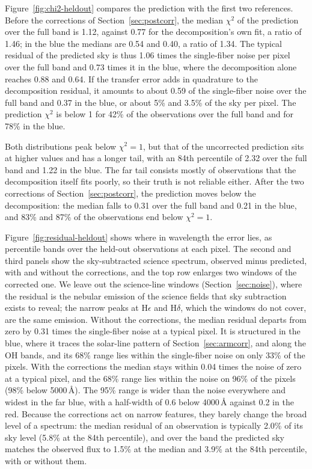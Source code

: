 Figure~\ref{fig:chi2-heldout} compares the prediction with the first two
references. Before the corrections of Section~\ref{sec:postcorr}, the median
$\chi^2$ of the prediction over the full band is 1.12, against 0.77 for the
decomposition's own fit, a ratio of 1.46; in the blue the medians are 0.54
and 0.40, a ratio of 1.34. The typical residual of the predicted sky is thus
1.06 times the single-fiber noise per pixel over the full band and 0.73
times it in the blue, where the decomposition alone reaches 0.88 and 0.64.
If the transfer error adds in quadrature to the decomposition residual, it
amounts to about 0.59 of the single-fiber noise over the full band and 0.37
in the blue, or about 5\% and 3.5\% of the sky per pixel. The prediction
$\chi^2$ is below 1 for 42\% of the observations over the full band and for
78\% in the blue.

Both distributions peak below $\chi^2=1$, but that of the uncorrected
prediction sits at higher values and has a longer tail, with an 84th
percentile of 2.32 over the full band and 1.22 in the blue. The far tail
consists mostly of observations that the decomposition itself fits poorly,
so their truth is not reliable either. After the two corrections of
Section~\ref{sec:postcorr}, the prediction moves below the decomposition:
the median falls to 0.31 over the full band and 0.21 in the blue, and 83\%
and 87\% of the observations end below $\chi^2=1$.

Figure~\ref{fig:residual-heldout} shows where in wavelength the error lies,
as percentile bands over the held-out observations at each pixel. The
second and third panels show the sky-subtracted science spectrum, observed
minus predicted, with and without the corrections, and the top row enlarges
two windows of the corrected one. We leave out the science-line windows
(Section~\ref{sec:noise}), where the residual is the nebular emission of the
science fields that sky subtraction exists to reveal; the narrow peaks at
H$\epsilon$ and H$\delta$, which the windows do not cover, are the same
emission. Without the corrections, the median residual departs from zero by
0.31 times the single-fiber noise at a typical pixel. It is structured in
the blue, where it traces the solar-line pattern of
Section~\ref{sec:armcorr}, and along the OH bands, and its 68\% range lies
within the single-fiber noise on only 33\% of the pixels. With the
corrections the median stays within 0.04 times the noise of zero at a
typical pixel, and the 68\% range lies within the noise on 96\% of the
pixels (98\% below 5000\,\AA). The 95\% range is wider than the noise
everywhere and widest in the far blue, with a half-width of 0.6 below
4000\,\AA{} against 0.2 in the red. Because the corrections act on narrow
features, they barely change the broad level of a spectrum: the median
residual of an observation is typically 2.0\% of its sky level (5.8\% at the
84th percentile), and over the band the predicted sky matches the observed
flux to 1.5\% at the median and 3.9\% at the 84th percentile, with or
without them.

